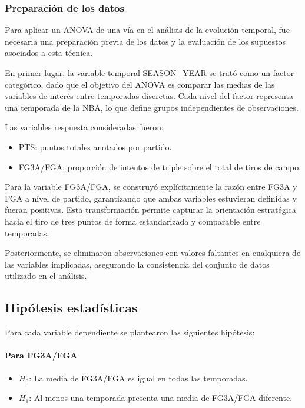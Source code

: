\documentclass[12pt]{article}
\begin{document}
\subsubsection{Preparación de los datos}
\label{subsubsec:anova-preparacion-supuestos}

Para aplicar un ANOVA de una vía en el análisis de la evolución temporal, fue necesaria una
preparación previa de los datos y la evaluación de los supuestos asociados a esta técnica.


En primer lugar, la variable temporal SEASON\_YEAR se trató como un factor categórico,
dado que el objetivo del ANOVA es comparar las medias de las variables de interés entre
temporadas discretas. Cada nivel del factor representa una temporada de la NBA, lo que
define grupos independientes de observaciones.

Las variables respuesta consideradas fueron:

\begin{itemize}
    \item PTS: puntos totales anotados por partido.
    \item FG3A/FGA: proporción de intentos de triple sobre el total de tiros de campo.
\end{itemize}

Para la variable FG3A/FGA, se construyó explícitamente la razón entre FG3A y FGA a nivel de
partido, garantizando que ambas variables estuvieran definidas y fueran positivas. Esta
transformación permite capturar la orientación estratégica hacia el tiro de tres puntos de
forma estandarizada y comparable entre temporadas.

Posteriormente, se eliminaron observaciones con valores faltantes en cualquiera de las
variables implicadas, asegurando la consistencia del conjunto de datos utilizado en el
análisis.

\subsection{Hipótesis estadísticas}

Para cada variable dependiente se plantearon las siguientes hipótesis:

\paragraph{Para FG3A/FGA}
\begin{itemize}
    \item $H_0$: La media de FG3A/FGA es igual en todas las temporadas.
    \item $H_1$: Al menos una temporada presenta una media de FG3A/FGA diferente.
\end{itemize}
\end{document}
